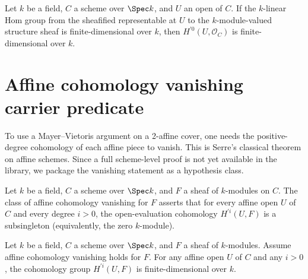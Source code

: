 \begin{theorem}
  \label{thm:Scheme_module_finite_HModule_prime_zero_curve}
  Let \(k\) be a field, \(C\) a scheme over \(\Spec k\), and \(U\) an open of \(C\). If the \(k\)-linear Hom group from the sheafified representable at \(U\) to the \(k\)-module-valued structure sheaf is finite-dimensional over \(k\), then \(H^{\prime 0}(U, \mathcal O_C)\) is finite-dimensional over \(k\).
\end{theorem}

\section{Affine cohomology vanishing carrier predicate}
\label{sec:IsAffineHModuleVanishing_iter040}

To use a Mayer--Vietoris argument on a 2-affine cover, one needs the positive-degree cohomology of each affine piece to vanish. This is Serre's classical theorem on affine schemes. Since a full scheme-level proof is not yet available in the library, we package the vanishing statement as a hypothesis class.

\begin{definition}
  \label{thm:Scheme_IsAffineHModuleVanishing}
  Let \(k\) be a field, \(C\) a scheme over \(\Spec k\), and \(F\) a sheaf of \(k\)-modules on \(C\). The class of affine cohomology vanishing for \(F\) asserts that for every affine open \(U\) of \(C\) and every degree \(i > 0\), the open-evaluation cohomology \(H^{\prime i}(U, F)\) is a subsingleton (equivalently, the zero \(k\)-module).
\end{definition}

\begin{theorem}
  \label{thm:Scheme_module_finite_HModule_prime_of_isAffineHModuleVanishing}
  Let \(k\) be a field, \(C\) a scheme over \(\Spec k\), and \(F\) a sheaf of \(k\)-modules. Assume affine cohomology vanishing holds for \(F\). For any affine open \(U\) of \(C\) and any \(i > 0\), the cohomology group \(H^{\prime i}(U, F)\) is finite-dimensional over \(k\).
\end{theorem}

